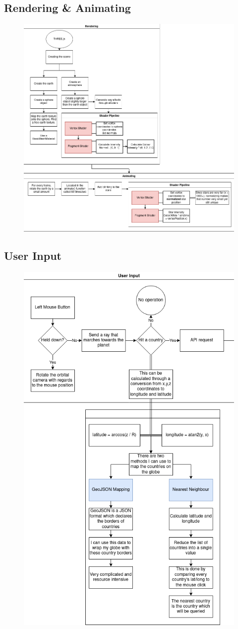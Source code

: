 \subsection{Rendering \& Animating}
\begin{figure}[h]
\centering
\includegraphics[width=1.0\linewidth]{images/renderanimate}
\caption{}
\label{fig:renderanimate}
\end{figure}

\newpage
\subsection{User Input}
\begin{figure}[h]
\centering
\includegraphics[width=0.6\linewidth]{images/input}
\caption{}
\label{fig:input}
\end{figure}

